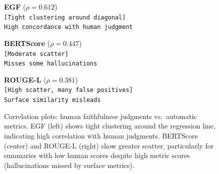 \begin{figure}[t]
\centering
\caption{Correlation plots: human faithfulness judgments vs.\ automatic metrics.
EGF (left) shows tight clustering around the regression line, indicating high correlation with human judgments. BERTScore (center) and ROUGE-L (right) show greater scatter, particularly for summaries with low human scores despite high metric scores (hallucinations missed by surface metrics).}
\label{figure:egf_correlation_scatter}
\small
\begin{minipage}{0.32\linewidth}
\centering
\textbf{EGF} ($\rho = 0.612$) \\
\texttt{[Tight clustering around diagonal]}\\
\texttt{High concordance with human judgment}
\end{minipage}
\hfill
\begin{minipage}{0.32\linewidth}
\centering
\textbf{BERTScore} ($\rho = 0.447$) \\
\texttt{[Moderate scatter]}\\
\texttt{Misses some hallucinations}
\end{minipage}
\hfill
\begin{minipage}{0.32\linewidth}
\centering
\textbf{ROUGE-L} ($\rho = 0.381$) \\
\texttt{[High scatter, many false positives]}\\
\texttt{Surface similarity misleads}
\end{minipage}
\end{figure}



